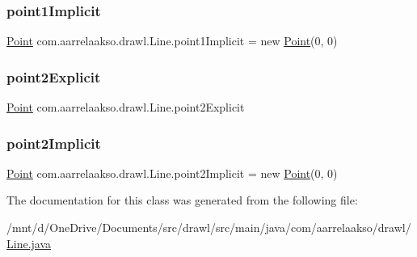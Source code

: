 \subsubsection{\texorpdfstring{point1\+Implicit}{point1Implicit}}
{\footnotesize\ttfamily \hyperlink{classcom_1_1aarrelaakso_1_1drawl_1_1_point}{Point} com.\+aarrelaakso.\+drawl.\+Line.\+point1\+Implicit = new \hyperlink{classcom_1_1aarrelaakso_1_1drawl_1_1_point}{Point}(0, 0)\hspace{0.3cm}{\ttfamily [private]}}

\mbox{\label{classcom_1_1aarrelaakso_1_1drawl_1_1_line_a6dac91f727b34d1d798892ed6b6c2475}} 
\subsubsection{\texorpdfstring{point2\+Explicit}{point2Explicit}}
{\footnotesize\ttfamily \hyperlink{classcom_1_1aarrelaakso_1_1drawl_1_1_point}{Point} com.\+aarrelaakso.\+drawl.\+Line.\+point2\+Explicit\hspace{0.3cm}{\ttfamily [private]}}

\mbox{\label{classcom_1_1aarrelaakso_1_1drawl_1_1_line_a055d1e743c66cc808f108664b38d7de2}} 
\subsubsection{\texorpdfstring{point2\+Implicit}{point2Implicit}}
{\footnotesize\ttfamily \hyperlink{classcom_1_1aarrelaakso_1_1drawl_1_1_point}{Point} com.\+aarrelaakso.\+drawl.\+Line.\+point2\+Implicit = new \hyperlink{classcom_1_1aarrelaakso_1_1drawl_1_1_point}{Point}(0, 0)\hspace{0.3cm}{\ttfamily [private]}}



The documentation for this class was generated from the following file\+:\begin{DoxyCompactItemize}
\item 
/mnt/d/\+One\+Drive/\+Documents/src/drawl/src/main/java/com/aarrelaakso/drawl/\hyperlink{_line_8java}{Line.\+java}\end{DoxyCompactItemize}
